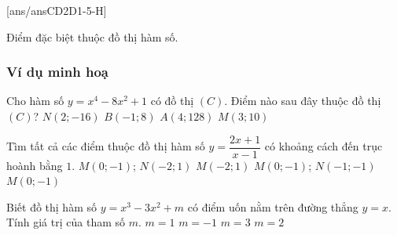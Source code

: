 [ans/ansCD2D1-5-H]
\begin{dang}{Điểm đặc biệt thuộc đồ thị hàm số}.
\end{dang}
\subsubsection{Ví dụ minh hoạ}
\begin{vd}%
	Cho hàm số $y=x^4-8x^2+1$ có đồ thị $(C)$. Điểm nào sau đây thuộc đồ thị $(C)$? 
	\choice
	{$N(2;-16)$}
	{$B(-1; 8)$}
	{$A(4; 128)$}
	{\True $M(3; 10)$}
\end{vd}
\begin{vd}%
	Tìm tất cả các điểm thuộc đồ thị hàm số $y=\dfrac{2x+1}{x-1}$ có khoảng cách đến trục hoành bằng $1$. 
	\choice
	{\True $M(0;-1)$; $N(-2;1)$}
	{$M(-2;1)$}
	{$M(0;-1)$; $N(-1;-1)$}
	{$M(0;-1)$}
\end{vd}
\begin{vd}%
	Biết đồ thị hàm số $y=x^3-3x^2+m$ có điểm uốn nằm trên đường thẳng $y=x$. Tính giá trị của tham số $m$. 
	\choice
	{$m=1$}
	{$m=-1$}
	{\True $m=3$}
	{$m=2$}
\end{vd}
